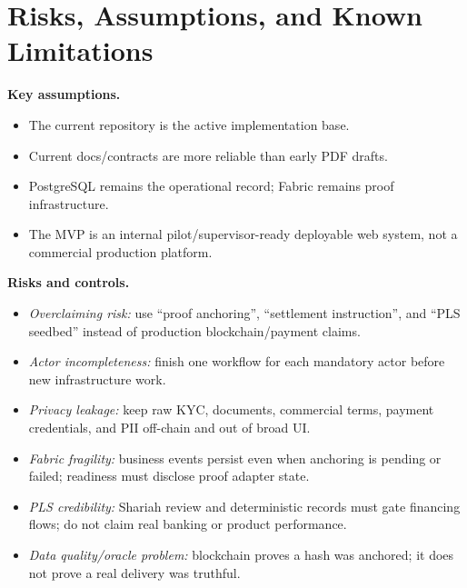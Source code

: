 \documentclass[conference]{IEEEtran}
\begin{document}
\section{Risks, Assumptions, and Known Limitations}
\textbf{Key assumptions.}
\begin{itemize}
  \item The current repository is the active implementation base.
  \item Current docs/contracts are more reliable than early PDF drafts.
  \item PostgreSQL remains the operational record; Fabric remains proof infrastructure.
  \item The MVP is an internal pilot/supervisor-ready deployable web system, not a commercial production platform.
\end{itemize}

\textbf{Risks and controls.}
\begin{itemize}
  \item \textit{Overclaiming risk:} use ``proof anchoring'', ``settlement instruction'', and ``PLS seedbed'' instead of production blockchain/payment claims.
  \item \textit{Actor incompleteness:} finish one workflow for each mandatory actor before new infrastructure work.
  \item \textit{Privacy leakage:} keep raw KYC, documents, commercial terms, payment credentials, and PII off-chain and out of broad UI.
  \item \textit{Fabric fragility:} business events persist even when anchoring is pending or failed; readiness must disclose proof adapter state.
  \item \textit{PLS credibility:} Shariah review and deterministic records must gate financing flows; do not claim real banking or product performance.
  \item \textit{Data quality/oracle problem:} blockchain proves a hash was anchored; it does not prove a real delivery was truthful.
\end{itemize}
\end{document}
